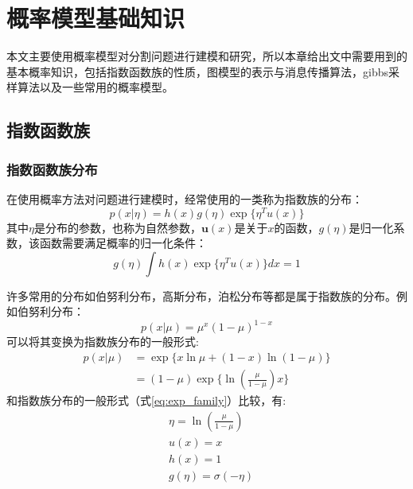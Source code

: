 \chapter{概率模型基础知识}
本文主要使用概率模型对分割问题进行建模和研究\cite{bishop2006pattern}，所以本章给出文中需要用到的基本概率知识，包括指数函数族的性质，图模型的表示与消息传播算法，gibbs采样算法以及一些常用的概率模型。
\section{指数函数族}\label{sec:exp_family}
\subsection{指数函数族分布}
在使用概率方法对问题进行建模时，经常使用的一类称为指数族\cite{wainwright2008graphical,jordan:2003introduction}的分布：
\begin{equation}
p(x |\eta) = h(x)g(\eta)\exp\{\eta^T{u}(x)\}\label{eq:exp_family}
\end{equation}
其中$\eta$是分布的参数，也称为自然参数，${\bm u}(x)$是关于$x$的函数，$g(\eta)$是归一化系数，该函数需要满足概率的归一化条件：
\begin{equation}
g(\eta)\int h(x)\exp\{\eta^T{u}(x)\}dx = 1 \label{eq:exp_family_norm}
\end{equation}

许多常用的分布如伯努利分布，高斯分布，泊松分布等都是属于指数族的分布。例如伯努利分布：
\begin{equation}
p(x |\mu) = \mu^x{(1-\mu)}^{1-x}\label{eq:bern_dis}
\end{equation}
可以将其变换为指数族分布的一般形式:
\begin{equation}
\begin{aligned}
p(x|\mu) &= \exp\{x\ln \mu + (1-x) \ln (1-\mu)\}\\
											& = (1-\mu)\exp{\{\ln (\frac{\mu}{1-\mu})x\}}
\end{aligned}
\end{equation}
和指数族分布的一般形式（式\eqref{eq:exp_family}）比较，有:
\begin{equation}
\begin{split}
&\eta = \ln (\frac{\mu}{1-\mu})\\
&u(x) = x\\
&h(x) = 1\\
&g(\eta) = \sigma(-\eta)
\end{split}
\end{equation}

